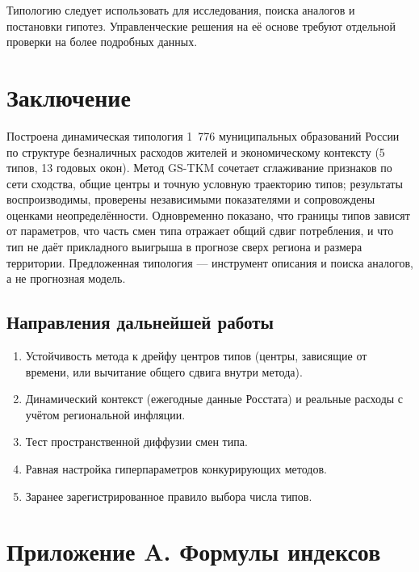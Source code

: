 \documentclass[11pt,a4paper]{article}
\providecommand{\tightlist}{\setlength{\itemsep}{1pt}\setlength{\parskip}{0pt}}
\begin{document}
Типологию следует использовать для исследования, поиска аналогов и постановки гипотез. Управленческие решения на её основе требуют отдельной проверки на более подробных данных.

\section{Заключение}\label{ux437ux430ux43aux43bux44eux447ux435ux43dux438ux435}

Построена динамическая типология 1~776 муниципальных образований России по структуре безналичных расходов жителей и экономическому контексту (5 типов, 13 годовых окон). Метод GS-TKM сочетает сглаживание признаков по сети сходства, общие центры и точную условную траекторию типов; результаты воспроизводимы, проверены независимыми показателями и сопровождены оценками неопределённости. Одновременно показано, что границы типов зависят от параметров, что часть смен типа отражает общий сдвиг потребления, и что тип не даёт прикладного выигрыша в прогнозе сверх региона и размера территории. Предложенная типология --- инструмент описания и поиска аналогов, а не прогнозная модель.

\subsection{Направления дальнейшей работы}\label{ux43dux430ux43fux440ux430ux432ux43bux435ux43dux438ux44f-ux434ux430ux43bux44cux43dux435ux439ux448ux435ux439-ux440ux430ux431ux43eux442ux44b}

\begin{enumerate}
\def\labelenumi{\arabic{enumi}.}
\tightlist
\item
  Устойчивость метода к дрейфу центров типов (центры, зависящие от времени, или вычитание общего сдвига внутри метода).
\item
  Динамический контекст (ежегодные данные Росстата) и реальные расходы с учётом региональной инфляции.
\item
  Тест пространственной диффузии смен типа.
\item
  Равная настройка гиперпараметров конкурирующих методов.
\item
  Заранее зарегистрированное правило выбора числа типов.
\end{enumerate}

\section*{Приложение A. Формулы индексов}\label{ux43fux440ux438ux43bux43eux436ux435ux43dux438ux435-a.-ux444ux43eux440ux43cux443ux43bux44b-ux438ux43dux434ux435ux43aux441ux43eux432}
\end{document}
